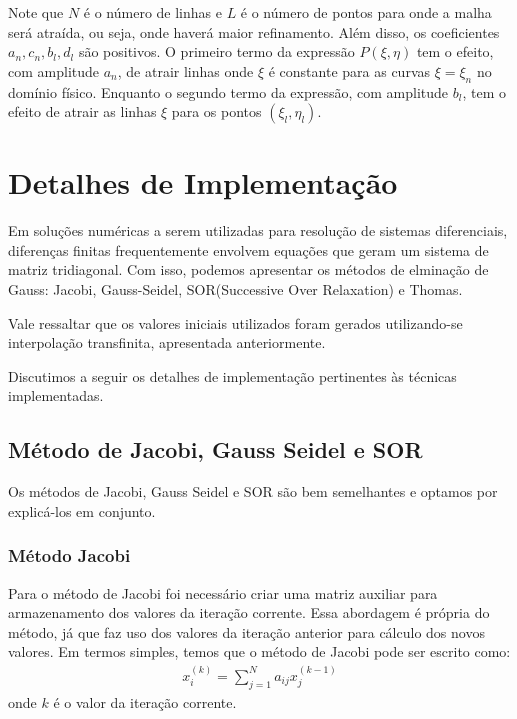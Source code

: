 \documentclass{article}
\begin{document}
			Note que $N$ é o número de linhas e $L$ é o número de pontos para onde a malha será atraída, ou seja, onde haverá maior refinamento. Além disso, os coeficientes $a_n, c_n, b_l, d_l$ são positivos. O primeiro termo da expressão $P(\xi,\eta)$ tem o efeito, com amplitude $a_n$, de atrair linhas onde $\xi$ é constante para as curvas $\xi = \xi_n$ no domínio físico. Enquanto o segundo termo da expressão, com amplitude $b_l$, tem o efeito de atrair as linhas $\xi$ para os pontos $(\xi_l, \eta_l)$.

	\section{Detalhes de Implementação} %
	\label{sec:detalhes_de_implementa_o}
		Em soluções numéricas a serem utilizadas para resolução de sistemas diferenciais, diferenças finitas frequentemente envolvem equações que geram um sistema de matriz tridiagonal. Com isso, podemos apresentar os métodos de elminação de Gauss: Jacobi, Gauss-Seidel, SOR(Successive Over Relaxation) e Thomas.

		Vale ressaltar que os valores iniciais utilizados foram gerados utilizando-se interpolação transfinita, apresentada anteriormente.

		Discutimos a seguir os detalhes de implementação pertinentes às técnicas implementadas.

		\subsection{Método de Jacobi, Gauss Seidel e SOR} %
		\label{sub:m_todo_de_jacobi}
			Os métodos de Jacobi, Gauss Seidel e SOR são bem semelhantes e optamos por explicá-los em conjunto.

			\subsubsection{Método Jacobi} %
			\label{ssub:m_todo_jacobi}
				Para o método de Jacobi foi necessário criar uma matriz auxiliar para armazenamento dos valores da iteração corrente. Essa abordagem é própria do método, já que faz uso dos valores da iteração anterior para cálculo dos novos valores. Em termos simples, temos que o método de Jacobi pode ser escrito como:
				\begin{eqnarray*}
					x_i^{(k)} = \sum_{j=1}^N a_{ij}x_j^{(k-1)}
				\end{eqnarray*}
				onde $k$ é o valor da iteração corrente.
\end{document}
